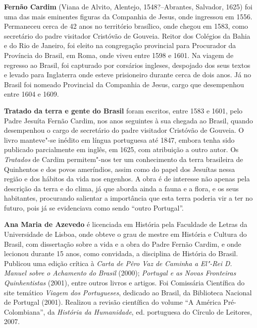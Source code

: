

\textbf{Fernão Cardim} (Viana de Alvito, Alentejo, 1548?--Abrantes, Salvador, 1625) foi uma das mais eminentes figuras da 
Companhia de Jesus, onde ingressou em 1556. Permaneceu cerca de 42 anos no território brasílico, onde chegou em 1583, como secretário do padre visitador Cristóvão de Gouveia. Reitor dos Colégios da Bahia e do Rio de Janeiro, 
foi eleito na congregação provincial para Procurador da Província do Brasil, em Roma, onde viveu entre 1598 e 1601. 
Na viagem de regresso ao Brasil, foi 
capturado por corsários ingleses, despojado dos seus textos e levado para Inglaterra onde esteve prisioneiro 
durante cerca de dois anos. Já no Brasil foi nomeado Provincial da Companhia de Jesus, cargo que 
desempenhou entre 1604 e 1609. 

\textbf{Tratado da terra e gente do Brasil} foram escritos, entre 1583 e 1601, 
pelo Padre Jesuíta Fernão Cardim, nos anos seguintes à sua chegada ao Brasil, 
quando desempenhou o cargo de secretário do padre visitador Cristóvão de Gouveia. O livro manteve"-se inédito 
em língua portuguesa até 1847, embora tenha sido publicado parcialmente em inglês, em 1625, com atribuição
a outro autor. 
Os \textit{Tratados} de Cardim permitem"-nos ter um conhecimento da terra brasileira de Quinhentos e dos povos ameríndios, assim como do papel dos Jesuítas nessa região e dos hábitos da vida nos engenhos. 
A obra é de interesse não apenas pela descrição da terra e do clima, já que aborda ainda a fauna e a flora, e os seus 
habitantes, procurando salientar a importância que esta terra poderia vir a ter no futuro, pois já se evidenciava como 
sendo ``outro Portugal''. 

\textbf{Ana Maria de Azevedo} é licenciada em História pela Faculdade de Letras da Universidade de Lisboa, 
onde obteve o grau de mestre em História e Cultura do Brasil, com dissertação sobre a vida e a obra 
do Padre Fernão Cardim, e onde lecionou durante 15 anos, como convidada, a disciplina de História do Brasil. 
Publicou uma edição crítica à \textit{Carta de Pêro Vaz de Caminha 
a El"-Rei D. Manuel sobre o Achamento do Brasil} (2000); \textit{Portugal e as Novas Fronteiras Quinhentistas} 
(2001), entre outros livros e artigos. Foi Comissária Científica do site temático \textit{Viagem dos Portugueses}, 
dedicado ao Brasil, da Biblioteca Nacional de Portugal (2001). Realizou a revisão científica do volume ``A América Pré-Colombiana'', da \textit{História da Humanidade}, ed. portuguesa do Círculo de Leitores, 2007.


